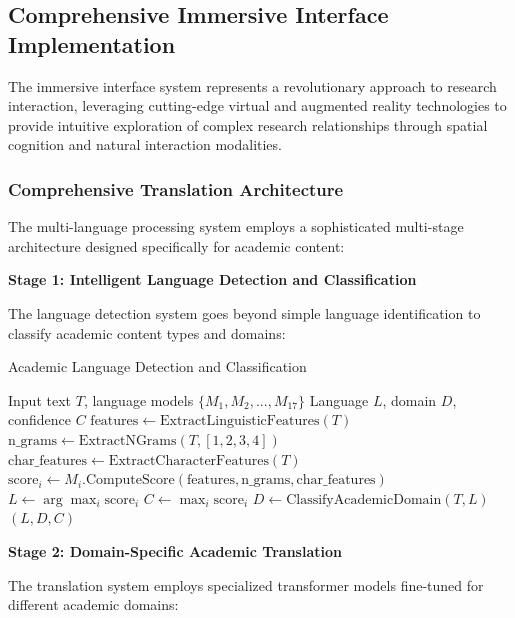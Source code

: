 \documentclass[10pt,twocolumn]{article}
\begin{document}
\subsection{Comprehensive Immersive Interface Implementation}

The immersive interface system represents a revolutionary approach to research interaction, leveraging cutting-edge virtual and augmented reality technologies to provide intuitive exploration of complex research relationships through spatial cognition and natural interaction modalities.

\subsubsection{Comprehensive Translation Architecture}

The multi-language processing system employs a sophisticated multi-stage architecture designed specifically for academic content:

\textbf{Stage 1: Intelligent Language Detection and Classification}

The language detection system goes beyond simple language identification to classify academic content types and domains:

\begin{algorithm}[H]
\caption{Academic Language Detection and Classification}
\label{alg:lang_detection}
\begin{algorithmic}[1]
\REQUIRE Input text $T$, language models $\{M_1, M_2, ..., M_{17}\}$
\ENSURE Language $L$, domain $D$, confidence $C$
\STATE $\text{features} \leftarrow \text{ExtractLinguisticFeatures}(T)$
\STATE $\text{n\_grams} \leftarrow \text{ExtractNGrams}(T, [1, 2, 3, 4])$
\STATE $\text{char\_features} \leftarrow \text{ExtractCharacterFeatures}(T)$
    \STATE $\text{score}_i \leftarrow M_i.\text{ComputeScore}(\text{features}, \text{n\_grams}, \text{char\_features})$
\ENDFOR
\STATE $L \leftarrow \arg\max_i \text{score}_i$
\STATE $C \leftarrow \max_i \text{score}_i$
\STATE $D \leftarrow \text{ClassifyAcademicDomain}(T, L)$
\RETURN $(L, D, C)$
\end{algorithmic}
\end{algorithm}

\textbf{Stage 2: Domain-Specific Academic Translation}

The translation system employs specialized transformer models fine-tuned for different academic domains:
\end{document}
